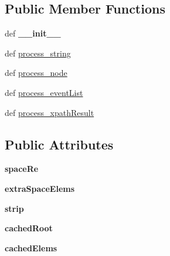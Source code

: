 \subsection*{Public Member Functions}
\begin{DoxyCompactItemize}
\item 
\hypertarget{classcheshire3_1_1extractor_1_1_simple_extractor_a61426d2ccbfe196c486dd51c46ee3780}{def {\bfseries \-\_\-\-\_\-init\-\_\-\-\_\-}}\label{classcheshire3_1_1extractor_1_1_simple_extractor_a61426d2ccbfe196c486dd51c46ee3780}

\item 
def \hyperlink{classcheshire3_1_1extractor_1_1_simple_extractor_abdbeb86df298c62180785237fceb58b4}{process\-\_\-string}
\item 
def \hyperlink{classcheshire3_1_1extractor_1_1_simple_extractor_aef4a8ec9cd2ff706fd8e7ff843308a4e}{process\-\_\-node}
\item 
def \hyperlink{classcheshire3_1_1extractor_1_1_simple_extractor_a4179e4e7eacc91fb509819f50f70153c}{process\-\_\-event\-List}
\item 
def \hyperlink{classcheshire3_1_1extractor_1_1_simple_extractor_af58ab4566f5fe1f86c635afec2e5037e}{process\-\_\-xpath\-Result}
\end{DoxyCompactItemize}
\subsection*{Public Attributes}
\begin{DoxyCompactItemize}
\item 
\hypertarget{classcheshire3_1_1extractor_1_1_simple_extractor_a9eda6e59a1d6af7bfab406675093f26d}{{\bfseries space\-Re}}\label{classcheshire3_1_1extractor_1_1_simple_extractor_a9eda6e59a1d6af7bfab406675093f26d}

\item 
\hypertarget{classcheshire3_1_1extractor_1_1_simple_extractor_a964a6928550189a02464ff61c6534ab8}{{\bfseries extra\-Space\-Elems}}\label{classcheshire3_1_1extractor_1_1_simple_extractor_a964a6928550189a02464ff61c6534ab8}

\item 
\hypertarget{classcheshire3_1_1extractor_1_1_simple_extractor_a6b53e98e295d821e37b6fb31a1718516}{{\bfseries strip}}\label{classcheshire3_1_1extractor_1_1_simple_extractor_a6b53e98e295d821e37b6fb31a1718516}

\item 
\hypertarget{classcheshire3_1_1extractor_1_1_simple_extractor_a39b971520905e9e0f571156ebf842823}{{\bfseries cached\-Root}}\label{classcheshire3_1_1extractor_1_1_simple_extractor_a39b971520905e9e0f571156ebf842823}

\item 
\hypertarget{classcheshire3_1_1extractor_1_1_simple_extractor_a0d49f04d874d170433a173211a2c86df}{{\bfseries cached\-Elems}}\label{classcheshire3_1_1extractor_1_1_simple_extractor_a0d49f04d874d170433a173211a2c86df}

\end{DoxyCompactItemize}
